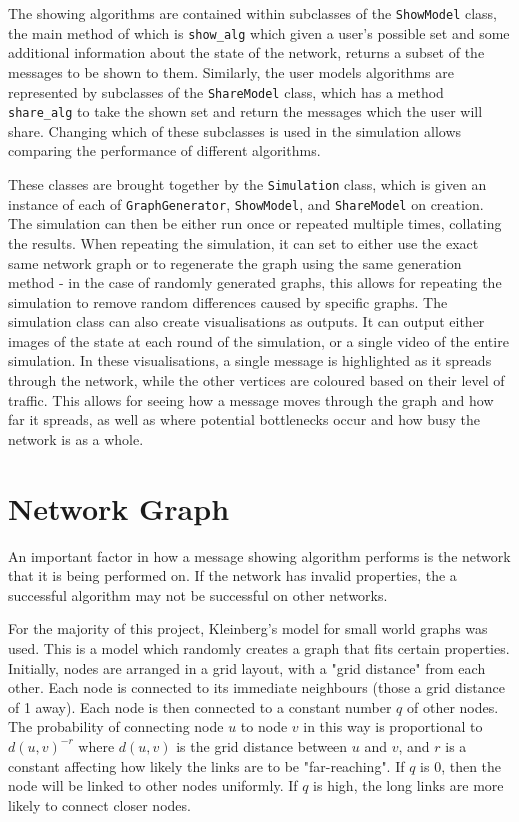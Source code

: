 \documentclass[bsc,frontabs,twoside,singlespacing,parskip,deptreport]{infthesis}     %
\begin{document}
The showing algorithms are contained within subclasses of the \texttt{ShowModel} class, the main method of which is \texttt{show\_alg} which given a user's possible set and some additional information about the state of the network, returns a subset of the messages to be shown to them. Similarly, the user models algorithms are represented by subclasses of the \texttt{ShareModel} class, which has a method \texttt{share\_alg} to take the shown set and return the messages which the user will share. Changing which of these subclasses is used in the simulation allows comparing the performance of different algorithms.

These classes are brought together by the \texttt{Simulation} class, which is given an instance of each of \texttt{GraphGenerator}, \texttt{ShowModel}, and \texttt{ShareModel} on creation. The simulation can then be either run once or repeated multiple times, collating the results. When repeating the simulation, it can set to either use the exact same network graph or to regenerate the graph using the same generation method - in the case of randomly generated graphs, this allows for repeating the simulation to remove random differences caused by specific graphs. The simulation class can also create visualisations as outputs. It can output either images of the state at each round of the simulation, or a single video of the entire simulation. In these visualisations, a single message is highlighted as it spreads through the network, while the other vertices are coloured based on their level of traffic. This allows for seeing how a message moves through the graph and how far it spreads, as well as where potential bottlenecks occur and how busy the network is as a whole.

\section{Network Graph}
An important factor in how a message showing algorithm performs is the network that it is being performed on. If the network has invalid properties, the a successful algorithm may not be successful on other networks.

For the majority of this project, Kleinberg's model for small world graphs was used\cite{Kleinberg00}. This is a model which randomly creates a graph that fits certain properties. Initially, nodes are arranged in a grid layout, with a "grid distance" from each other. Each node is connected to its immediate neighbours (those a grid distance of 1 away). Each node is then connected to a constant number $q$ of other nodes. The probability of connecting node $u$ to node $v$ in this way is proportional to $d(u, v)^{-r}$ where $d(u, v)$ is the grid distance between $u$ and $v$, and $r$ is a constant affecting how likely the links are to be "far-reaching". If $q$ is 0, then the node will be linked to other nodes uniformly. If $q$ is high, the long links are more likely to connect closer nodes.
\end{document}
